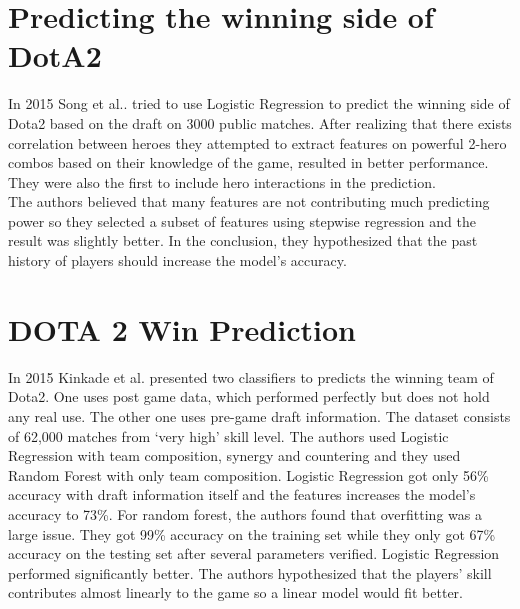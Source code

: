 \documentclass[12pt,openany,a4paper]{book}
\begin{document}
\section{Predicting the winning side of DotA2}
In 2015 Song et al.\cite{song2015predicting}. tried to use Logistic Regression to predict the winning side of Dota2 based on the draft on 3000 public matches. After realizing that there exists correlation between heroes they attempted to extract features on powerful 2-hero combos based on their knowledge of the game, resulted in better performance. They were also the first to include hero interactions in the prediction.\\ 

The authors believed that many features are not contributing much predicting power so they selected a subset of features using stepwise regression and the result was slightly better. In the conclusion, they hypothesized that the past history of players should increase the model's accuracy.\\

\section{DOTA 2 Win Prediction} 
In 2015 Kinkade et al.\cite{kinkade2015dota} presented two classifiers to predicts the winning team of Dota2.  One uses post game data, which performed perfectly but does not hold any real use. The other one uses pre-game draft information. The dataset consists of 62,000 matches from `very high' skill level. The authors used Logistic Regression with team composition, synergy and countering and they used Random Forest with only team composition. Logistic Regression got only 56\% accuracy with draft information itself and the features increases the model's accuracy to 73\%. For random forest, the authors found that overfitting was a large issue. They got 99\% accuracy on the training set while they only got 67\% accuracy on the testing set after several parameters verified. Logistic Regression performed significantly better. The authors hypothesized that the players' skill contributes almost linearly to the game so a linear model would fit better.\\
\end{document}
